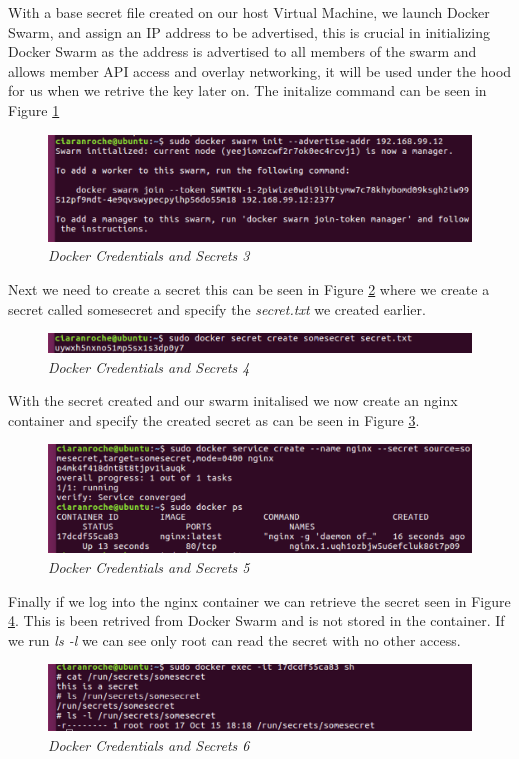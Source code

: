 With a base secret file created on our host Virtual Machine, we launch Docker Swarm, and assign an IP address to be advertised, this is crucial in initializing Docker Swarm as the address is advertised to all members of the swarm and allows member API access and overlay networking, it will be used under the hood for us when we retrive the key later on. The initalize command can be seen in Figure \ref{img:demo20}
\begin{figure}[!ht]
\centering
\includegraphics*[width=\textwidth]{images/term20.png}
\caption{\em Docker Credentials and Secrets 3}
\label{img:demo20}
\end{figure}

Next we need to create a secret this can be seen in Figure \ref{img:demo21} where we create a secret called somesecret and specify the \textit{secret.txt} we created earlier.
\begin{figure}[!ht]
\centering
\includegraphics*[width=\textwidth]{images/term21.png}
\caption{\em Docker Credentials and Secrets 4}
\label{img:demo21}
\end{figure}

With the secret created and our swarm initalised we now create an nginx container and specify the created secret as can be seen in Figure \ref{img:demo23}.
\begin{figure}[!ht]
\centering
\includegraphics*[width=\textwidth]{images/term23.png}
\caption{\em Docker Credentials and Secrets 5}
\label{img:demo23}
\end{figure}

Finally if we log into the nginx container we can retrieve the secret seen in Figure \ref{img:demo24}. This is been retrived from Docker Swarm and is not stored in the container. If we run \textit{ls -l} we can see only root can read the secret with no other access.
\begin{figure}[!ht]
\centering
\includegraphics*[width=\textwidth]{images/term24.png}
\caption{\em Docker Credentials and Secrets 6}
\label{img:demo24}
\end{figure}

